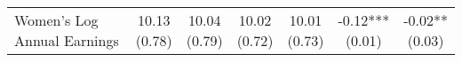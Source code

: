\begin{landscape}
\begin{ThreePartTable}
\begin{longtable}[t]{>{\raggedright\arraybackslash}p{5cm}cccccc}
\hspace{1em}Women’s Log Annual Earnings & \specialcell{10.13\\(0.78)} & \specialcell{10.04\\(0.79)} & \specialcell{10.02\\(0.72)} & \specialcell{10.01\\(0.73)} & \specialcell{-0.12***\\(0.01)} & \specialcell{-0.02**\\(0.03)}\\*
\end{longtable}
\end{ThreePartTable}
\end{landscape}
